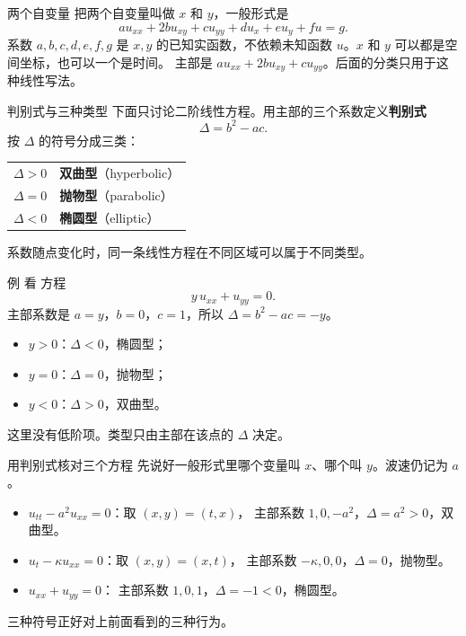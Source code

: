 \documentclass[fontset=windows, chinese, 10pt, xcolor=dvipsnames]{beamer}
\begin{document}
\begin{frame}{两个自变量}
  把两个自变量叫做 $x$ 和 $y$，一般形式是
  \begin{equation*}
    a u_{xx}+2b u_{xy}+c u_{yy}
    +d u_x+e u_y+fu=g.
  \end{equation*}
  系数 $a,b,c,d,e,f,g$ 是 $x,y$ 的已知实函数，不依赖未知函数 $u$。$x$ 和 $y$ 可以都是空间坐标，也可以一个是时间。
  \vspace{0.3em}
  主部是 $a u_{xx}+2b u_{xy}+c u_{yy}$。后面的分类只用于这种线性写法。
\end{frame}

\begin{frame}{判别式与三种类型}
  下面只讨论二阶线性方程。用主部的三个系数定义\textbf{判别式}
  \begin{equation*}
    \Delta=b^2-ac.
  \end{equation*}
  按 $\Delta$ 的符号分成三类：
  \begin{center}
  \begin{tabular}{ll}
    $\Delta>0$ & \textbf{双曲型}（hyperbolic）\\
    $\Delta=0$ & \textbf{抛物型}（parabolic）\\
    $\Delta<0$ & \textbf{椭圆型}（elliptic）
  \end{tabular}
  \end{center}
  系数随点变化时，同一条线性方程在不同区域可以属于不同类型。
\end{frame}

\begin{frame}{例}
  看%
  方程
  \begin{equation*}
    y\,u_{xx}+u_{yy}=0.
  \end{equation*}
  主部系数是 $a=y$，$b=0$，$c=1$，所以 $\Delta=b^2-ac=-y$。
  \begin{itemize}
    \item $y>0$：$\Delta<0$，椭圆型；
    \item $y=0$：$\Delta=0$，抛物型；
    \item $y<0$：$\Delta>0$，双曲型。
  \end{itemize}
  这里没有低阶项。类型只由主部在该点的 $\Delta$ 决定。
\end{frame}

\begin{frame}{用判别式核对三个方程}
  先说好一般形式里哪个变量叫 $x$、哪个叫 $y$。波速仍记为 $a$。
  \begin{itemize}
    \item $u_{tt}-a^2u_{xx}=0$：取 $(x,y)=(t,x)$，
      主部系数 $1,0,-a^2$，$\Delta=a^2>0$，双曲型。
    \item $u_t-\kappa u_{xx}=0$：取 $(x,y)=(x,t)$，
      主部系数 $-\kappa,0,0$，$\Delta=0$，抛物型。
    \item $u_{xx}+u_{yy}=0$：
      主部系数 $1,0,1$，$\Delta=-1<0$，椭圆型。
  \end{itemize}
  三种符号正好对上前面看到的三种行为。
\end{frame}
\end{document}
